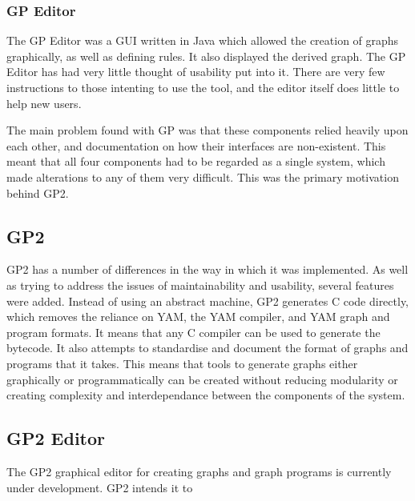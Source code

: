 \documentclass{UoYCSproject}
\begin{document}
\subsubsection{GP Editor}
The GP Editor was a GUI written in Java which allowed the creation of graphs graphically, as well as defining rules. It also displayed the derived graph.
The GP Editor has had very little thought of usability put into it. There are very few instructions to those intenting to use the tool, and the editor itself does little to help new users.

The main problem found with GP was that these components relied heavily upon each other, and documentation on how their interfaces are non-existent. %
This meant that all four components had to be regarded as a single system, which made alterations to any of them very difficult. This was the primary motivation behind GP2.

\subsection{GP2}

GP2 has a number of differences in the way in which it was implemented. As well as trying to address the issues of maintainability and usability, several features were added.
Instead of using an abstract machine, GP2 generates C code directly, which removes the reliance on YAM, the YAM compiler, and YAM graph and program formats. It means that any C compiler can be used to generate the bytecode. It also attempts to standardise and document the format of graphs and programs that it takes. This means that tools to generate graphs either graphically or programmatically can be created without reducing modularity or creating complexity and interdependance between the components of the system. %

\subsection{GP2 Editor}
The GP2 graphical editor for creating graphs and graph programs is currently under development. GP2 intends it to 
\end{document}
